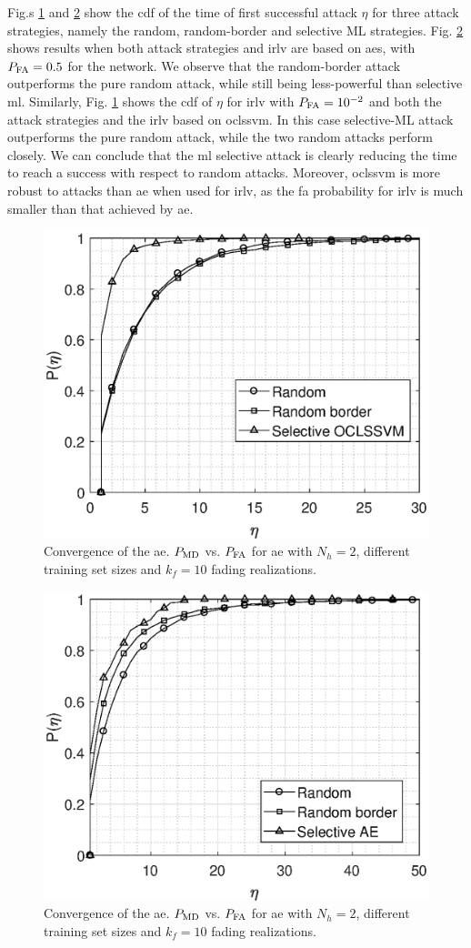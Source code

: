 \documentclass[draftcls,onecolumn,12pt]{IEEEtran}
\begin{document}
Fig.s \ref{fig:selectiveSVM} and \ref{fig:selectiveAE} show the \ac{cdf} of the time of first successful attack $\eta$ for three attack strategies, namely the random, random-border and selective ML strategies. Fig. \ref{fig:selectiveAE} shows results when both attack strategies and \ac{irlv} are based on \acp{ae}, with $P_{\rm FA} =0.5$ for the network. We observe that the random-border attack outperforms the pure random attack, while still being less-powerful than selective \ac{ml}. Similarly, Fig. \ref{fig:selectiveSVM} shows the \ac{cdf} of $\eta$ for \ac{irlv} with $P_{\rm FA}=10^{-2}$ and both the attack strategies and the \ac{irlv} based on \ac{oclssvm}. In this case selective-ML attack outperforms the pure random attack, while the two random attacks perform closely. We can conclude that the \ac{ml} selective attack is clearly reducing the time to reach a success with respect to random attacks. Moreover, \ac{oclssvm} is more robust to attacks than \ac{ae} when used for \ac{irlv}, as the \ac{fa} probability for \ac{irlv} is much smaller than that achieved by \ac{ae}.



\begin{figure}[t]
    \centering
    \includegraphics[width=0.6\columnwidth]{res_selective_SVM.eps}
    \caption{Convergence of the \ac{ae}. $P_{\rm MD}$ vs. $P_{\rm FA}$ for \ac{ae} with $N_h = 2$, different training set sizes and $k_f=10$ fading realizations.}
    \label{fig:selectiveSVM}
\end{figure}

\begin{figure}[t]
    \centering
    \includegraphics[width=0.6\columnwidth]{res_selective_AE.eps}
    \caption{Convergence of the \ac{ae}. $P_{\rm MD}$ vs. $P_{\rm FA}$ for \ac{ae} with $N_h = 2$, different training set sizes and $k_f=10$ fading realizations.}
    \label{fig:selectiveAE}
\end{figure}
\end{document}
